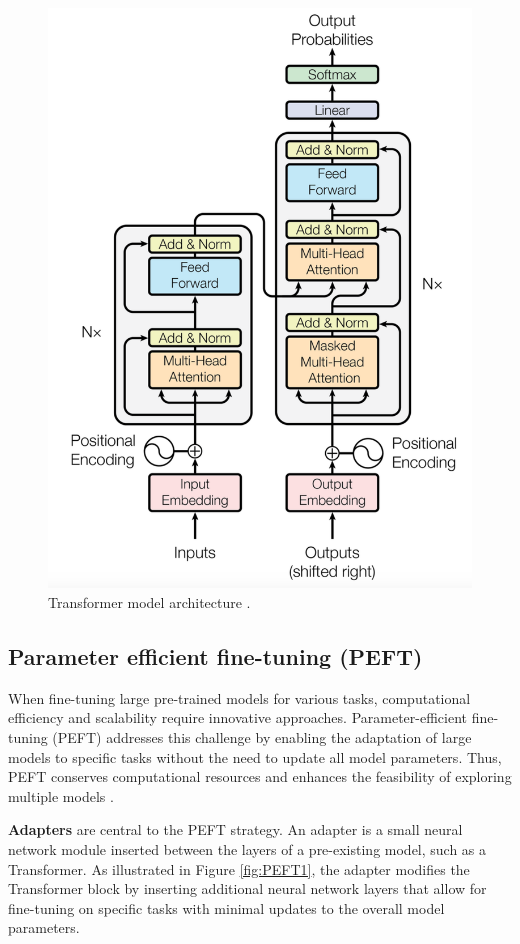\documentclass[conference]{IEEEtran}
\begin{document}
\begin{figure}[!h]
    \centering
    \includegraphics[width=.85\linewidth]{pictures/transformer_architecture.png}
    \caption{Transformer model architecture \cite{Vaswani2023}.}
\end{figure}

\subsection{Parameter efficient fine-tuning (PEFT)}%
When fine-tuning large pre-trained models for various tasks, computational efficiency and scalability require innovative approaches. Parameter-efficient fine-tuning (PEFT) addresses this challenge by enabling the adaptation of large models to specific tasks without the need to update all model parameters. Thus, PEFT conserves computational resources and enhances the feasibility of exploring multiple models \cite{pfeiffer2020adapterhub}.

\textbf{Adapters} are central to the PEFT strategy. An adapter is a small neural network module inserted between the layers of a pre-existing model, such as a Transformer. As illustrated in Figure \ref{fig:PEFT1}, the adapter modifies the Transformer block by inserting additional neural network layers that allow for fine-tuning on specific tasks with minimal updates to the overall model parameters.
\end{document}
